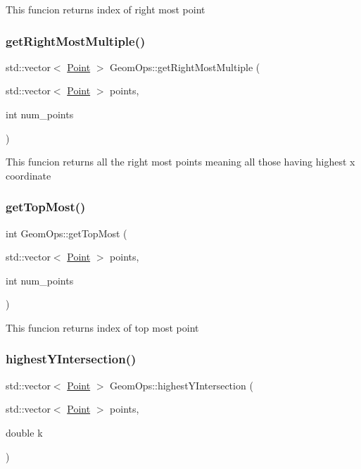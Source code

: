 This funcion returns index of right most point \mbox{\label{classGeomOps_a0c5f866d03e800a01d424fa9317a6c49}} 
\subsubsection{\texorpdfstring{get\+Right\+Most\+Multiple()}{getRightMostMultiple()}}
{\footnotesize\ttfamily std\+::vector$<$ \hyperlink{classPoint}{Point} $>$ Geom\+Ops\+::get\+Right\+Most\+Multiple (\begin{DoxyParamCaption}\item[{std\+::vector$<$ \hyperlink{classPoint}{Point} $>$}]{points,  }\item[{int}]{num\+\_\+points }\end{DoxyParamCaption})}

This funcion returns all the right most points meaning all those having highest x coordinate \mbox{\label{classGeomOps_adbbed35b057f010311831b409c4a07f8}} 
\subsubsection{\texorpdfstring{get\+Top\+Most()}{getTopMost()}}
{\footnotesize\ttfamily int Geom\+Ops\+::get\+Top\+Most (\begin{DoxyParamCaption}\item[{std\+::vector$<$ \hyperlink{classPoint}{Point} $>$}]{points,  }\item[{int}]{num\+\_\+points }\end{DoxyParamCaption})}

This funcion returns index of top most point \mbox{\label{classGeomOps_a1c86fdb20bc2c6667fc0c0a4e06dd180}} 
\subsubsection{\texorpdfstring{highest\+Y\+Intersection()}{highestYIntersection()}}
{\footnotesize\ttfamily std\+::vector$<$ \hyperlink{classPoint}{Point} $>$ Geom\+Ops\+::highest\+Y\+Intersection (\begin{DoxyParamCaption}\item[{std\+::vector$<$ \hyperlink{classPoint}{Point} $>$}]{points,  }\item[{double}]{k }\end{DoxyParamCaption})}

